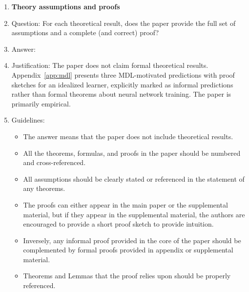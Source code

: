 \documentclass{article}
\begin{document}
\begin{enumerate}
\item {\bf Theory assumptions and proofs}
    \item[] Question: For each theoretical result, does the paper provide the full set of assumptions and a complete (and correct) proof?
    \item[] Answer: \answerNA{}
    \item[] Justification: The paper does not claim formal theoretical results. Appendix~\ref{app:mdl} presents three MDL-motivated predictions with proof sketches for an idealized learner, explicitly marked as informal predictions rather than formal theorems about neural network training. The paper is primarily empirical.
    \item[] Guidelines:
    \begin{itemize}
        \item The answer \answerNA{} means that the paper does not include theoretical results.
        \item All the theorems, formulas, and proofs in the paper should be numbered and cross-referenced.
        \item All assumptions should be clearly stated or referenced in the statement of any theorems.
        \item The proofs can either appear in the main paper or the supplemental material, but if they appear in the supplemental material, the authors are encouraged to provide a short proof sketch to provide intuition.
        \item Inversely, any informal proof provided in the core of the paper should be complemented by formal proofs provided in appendix or supplemental material.
        \item Theorems and Lemmas that the proof relies upon should be properly referenced.
    \end{itemize}


\end{enumerate}
\end{document}
